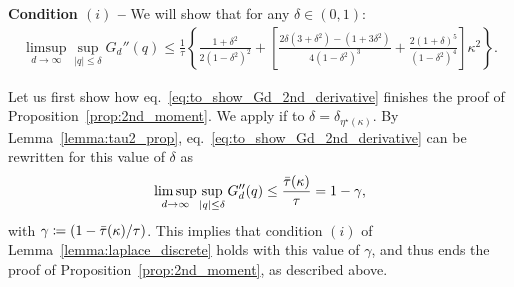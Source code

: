 \myskip
\textbf{Condition $(i)$ --}
We will show that for any $\delta \in (0,1)$:
\begin{align}\label{eq:to_show_Gd_2nd_derivative}
    \limsup_{d \to \infty}\sup_{|q| \leq \delta} G_d''(q) \leq 
    \frac{1}{\tau} \left\{\frac{1+\delta^2}{2(1-\delta^2)^2}
      + \left[\frac{2 \delta(3+\delta^2) - (1+3 \delta^2)}{4(1-\delta^2)^3} + \frac{2(1+\delta)^5}{(1-\delta^2)^4}\right] \kappa^2\right\}.
\end{align}

\myskip
Let us first show how eq.~\eqref{eq:to_show_Gd_2nd_derivative} finishes the proof of Proposition~\ref{prop:2nd_moment}. 
We apply if to $\delta = \delta_{\eta^\star(\kappa)}$. 
By Lemma~\ref{lemma:tau2_prop}, eq.~\eqref{eq:to_show_Gd_2nd_derivative} can be rewritten for this value of $\delta$ 
as 
\begin{align*}
    \limsup_{d \to \infty}\sup_{|q| \leq \delta} G_d''(q) \leq 
    \frac{{\bar{\tau}}(\kappa)}{\tau} = 1 - \gamma,
\end{align*}
with $\gamma \coloneqq (1 - {\bar{\tau}}(\kappa)/\tau)$.
This implies that condition $(i)$ of Lemma~\ref{lemma:laplace_discrete} holds with this value of $\gamma$, 
and thus ends the proof of Proposition~\ref{prop:2nd_moment}, as described above.

